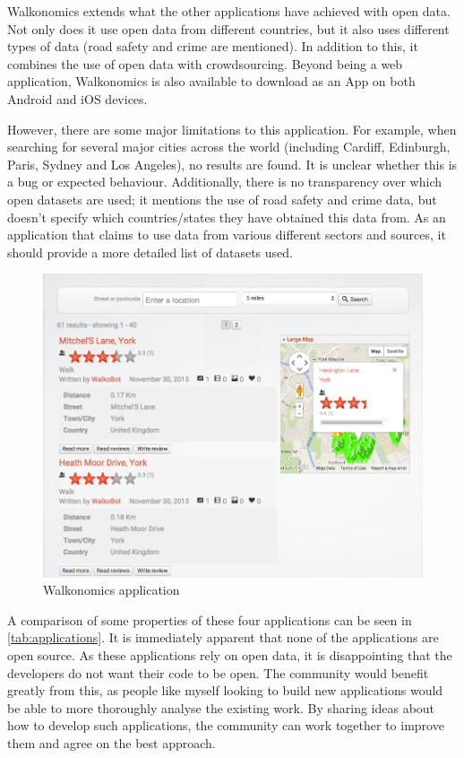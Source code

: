 \documentclass[authoryearcitations]{UoYCSproject}
\begin{document}
Walkonomics extends what the other applications have achieved with open data. Not only does it use open data from different countries, but it also uses different types of data (road safety and crime are mentioned). In addition to this, it combines the use of open data with crowdsourcing. Beyond being a web application, Walkonomics is also available to download as an App on both Android and iOS devices.

However, there are some major limitations to this application. For example, when searching for several major cities across the world (including Cardiff, Edinburgh, Paris, Sydney and Los Angeles), no results are found. It is unclear whether this is a bug or expected behaviour. Additionally, there is no transparency over which open datasets are used; it mentions the use of road safety and crime data, but doesn't specify which countries/states they have obtained this data from. As an application that claims to use data from various different sectors and sources, it should provide a more detailed list of datasets used.

\begin{figure}
	\includegraphics[scale=0.4]{walkonomics}
	\caption{Walkonomics application}
	\label{fig:walkonomics}
\end{figure}

A comparison of some properties of these four applications can be seen in \autoref{tab:applications}. It is immediately apparent that none of the applications are open source. As these applications rely on open data, it is disappointing that the developers do not want their code to be open. The community would benefit greatly from this, as people like myself looking to build new applications would be able to more thoroughly analyse the existing work. By sharing ideas about how to develop such applications, the community can work together to improve them and agree on the best approach.
\end{document}
